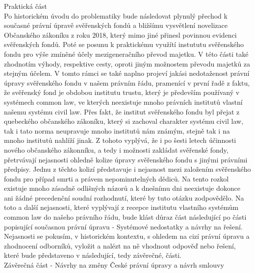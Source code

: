 \documentclass{article}
\begin{document}
\newpage

{\Large Praktická část}\\

Po historickém úvodu do problematiky bude následovat plynulý přechod k současné právní úpravě svěřenských fondů a bližšímu vysvětlení novelizace Občanského zákoníku z roku 2018, který mimo jiné přinesl povinnou evidenci svěřenských fondů. Poté se posunu k praktickému využítí instututu svěřenského fondu pro výše zmíněné účely mezigeneračního převod majetku. V této části také zhodnotím výhody, respektive cesty, oproti jiným možnostem převodu majetků za stejným účelem. V tomto rámci se také naplno projeví jakási nedotaženost právní úpravy svěřenského fondu v našem právním řádu, pramenící v první řadě z faktu, že svěřenský fond je obdobou institutu trustu, který je především používaný v systémech common law, ve kterých neexistuje mnoho právních institutů vlastní našemu systému civil law. Přes fakt, že institut svěřenského fondu byl přejat z quebeckého občanského zákoníku, který si zachoval charakter systému civil law, tak i tato norma neupravuje mnoho institutů nám známým, stejně tak i na mnoho institutů nahlíží jinak. Z tohoto vyplývá, že i po šesti letech účinnosti nového občanského zákonníku, a tedy i možnosti zakládat svěřenské fondy, přetrvávají nejasnosti ohledně kolize úpravy svěřenského fondu s jinými právními předpisy. Jednu z těchto kolizí představuje i nejasnost mezi založením svěřenského fondu pro případ smrti a právem nepominutelných dědiců. Na tento rozkol existuje mnoho zásadně odlišných názorů a k dnešnímu dni neexistuje dokonce ani žádné precedenční soudní rozhodnutí, které by tuto otázku zodpovědělo. Na toto a další nejasnosti, které vyplývají z recepce institutu vlastního systémům common law do našeho právního řádu, bude klást důraz část následující po části popisující současnou právní úpravu - Systémové nedostatky a návrhy na řešení. Nejasnosti se pokusím, v historickém kontextu, s ohledem na cizí právní úpravu a zhodnocení odborníků, vyložit a nalézt na ně vhodnout odpověď nebo řešení, které bude představeno v následující, tedy závěrečné, části. \\

{\Large Závěrečná část - Návrhy na změny České právní úpravy a návrh smlouvy}\\

\end{document}
